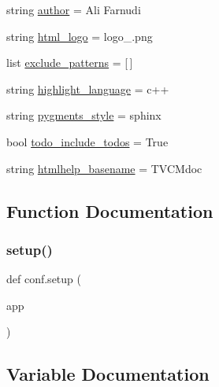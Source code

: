 \begin{DoxyCompactItemize}
\item 
string \mbox{\hyperlink{namespaceconf_a637c239d256432248aa8d9f3ab0b8c52}{author}} = \textquotesingle{}Ali Farnudi\textquotesingle{}
\item 
string \mbox{\hyperlink{namespaceconf_a85ebd472b7d3a9e41a63030cdd5944e6}{html\+\_\+logo}} = \textquotesingle{}logo\+\_.\+png\textquotesingle{}
\item 
list \mbox{\hyperlink{namespaceconf_a7ad48fb6f3e9b129c02346ea0d3527c1}{exclude\+\_\+patterns}} = \mbox{[}$\,$\mbox{]}
\item 
string \mbox{\hyperlink{namespaceconf_a3117edf4443d9b8c70a9f0f44294ba79}{highlight\+\_\+language}} = \textquotesingle{}c++\textquotesingle{}
\item 
string \mbox{\hyperlink{namespaceconf_a641130e096b26cba8a5d63ed38684de7}{pygments\+\_\+style}} = \textquotesingle{}sphinx\textquotesingle{}
\item 
bool \mbox{\hyperlink{namespaceconf_a8fe7f0d85f975f4ecba5cb6066959a09}{todo\+\_\+include\+\_\+todos}} = True
\item 
string \mbox{\hyperlink{namespaceconf_aab7fddb2766ce3c430d8246fbfdbc7b1}{htmlhelp\+\_\+basename}} = \textquotesingle{}T\+V\+C\+Mdoc\textquotesingle{}
\end{DoxyCompactItemize}


\subsection{Function Documentation}
\mbox{\label{namespaceconf_ab10c3cab2b831ad54a5b330ce0f414e0}} 
\subsubsection{\texorpdfstring{setup()}{setup()}}
{\footnotesize\ttfamily def conf.\+setup (\begin{DoxyParamCaption}\item[{}]{app }\end{DoxyParamCaption})}



\subsection{Variable Documentation}
\mbox{\label{namespaceconf_a637c239d256432248aa8d9f3ab0b8c52}} 
